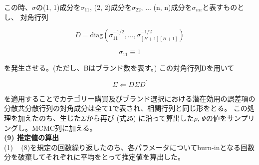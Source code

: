 \documentclass[11pt]{jsarticle}
\begin{document}
この時、$\sigma$の(1, 1)成分を$\sigma_{11}$, (2, 2)成分を$\sigma_{22}$, $\ldots$ (n, n)成分を$\sigma_{nn}$と表すものとし、
対角行列

\begin{equation} \label{formula55}
D = \mbox{diag} (\sigma_{11}^{-1/2}, \ldots, \sigma_{[B+1][B+1]}^{-1/2})
\end{equation}

\begin{equation} \label{formula55-1}
\sigma_{11} \equiv 1
\end{equation}

を発生させる。(ただし、Bはブランド数を表す。)
この対角行列Dを用いて

\begin{equation} \label{formula56}
\Sigma \Leftarrow D \Sigma D^{\prime}
\end{equation}

を適用することでカテゴリー購買及びブランド選択における潜在効用の誤差項の分散共分散行列の対角成分は全て1で表され、相関行列と同じ形をとる。
この処理を加えたのち、生じた$\Sigma$から再び
(式25)
に沿って算出した$\rho$, $\Psi$の値をサンプリングし。MCMC列に加える。\\[1ex] 

{\bf (9) 推定値の算出}\\
(1) ~ (8)を規定の回数繰り返したのち、各パラメータについてburn-inとなる回数分を破棄してそれぞれに平均をとって推定値を算出した。


\newpage



\end{document}
